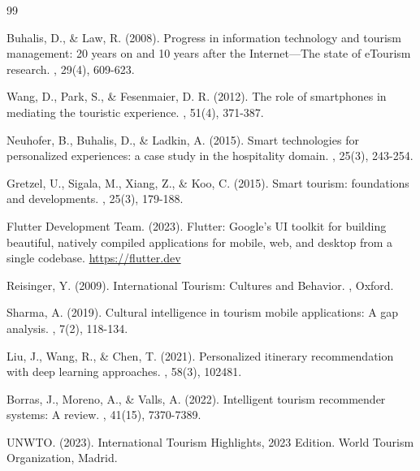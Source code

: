 \documentclass[11pt, a4paper]{article}
\begin{document}
\begin{thebibliography}{99}

Buhalis, D., \& Law, R. (2008).
\newblock Progress in information technology and tourism management: 20 years on and 10 years after the Internet—The state of eTourism research.
, 29(4), 609-623.

Wang, D., Park, S., \& Fesenmaier, D. R. (2012).
\newblock The role of smartphones in mediating the touristic experience.
, 51(4), 371-387.

Neuhofer, B., Buhalis, D., \& Ladkin, A. (2015).
\newblock Smart technologies for personalized experiences: a case study in the hospitality domain.
, 25(3), 243-254.

Gretzel, U., Sigala, M., Xiang, Z., \& Koo, C. (2015).
\newblock Smart tourism: foundations and developments.
, 25(3), 179-188.

Flutter Development Team. (2023).
\newblock Flutter: Google's UI toolkit for building beautiful, natively compiled applications for mobile, web, and desktop from a single codebase.
\newblock \url{https://flutter.dev}

Reisinger, Y. (2009).
\newblock International Tourism: Cultures and Behavior.
, Oxford.

Sharma, A. (2019).
\newblock Cultural intelligence in tourism mobile applications: A gap analysis.
, 7(2), 118-134.

Liu, J., Wang, R., \& Chen, T. (2021).
\newblock Personalized itinerary recommendation with deep learning approaches.
, 58(3), 102481.

Borras, J., Moreno, A., \& Valls, A. (2022).
\newblock Intelligent tourism recommender systems: A review.
, 41(15), 7370-7389.

UNWTO. (2023).
\newblock International Tourism Highlights, 2023 Edition.
\newblock World Tourism Organization, Madrid.

\end{thebibliography}
\end{document}

